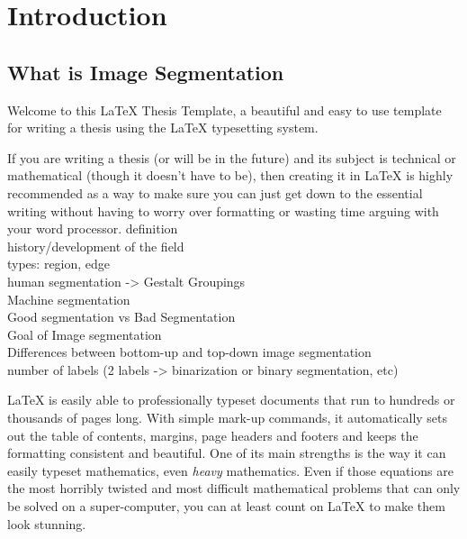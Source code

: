 
\chapter{Introduction} %

\label{Chapter1} %
\label{chap:Chapter1} %


\newcommand{\keyword}[1]{\textbf{#1}}
\newcommand{\tabhead}[1]{\textbf{#1}}
\newcommand{\code}[1]{\texttt{#1}}
\newcommand{\file}[1]{\texttt{\bfseries#1}}
\newcommand{\option}[1]{\texttt{\itshape#1}}


\section{What is Image Segmentation}
Welcome to this \LaTeX{} Thesis Template, a beautiful and easy to use template for writing a thesis using the \LaTeX{} typesetting system.

If you are writing a thesis (or will be in the future) and its subject is technical or mathematical (though it doesn't have to be), then creating it in \LaTeX{} is highly recommended as a way to make sure you can just get down to the essential writing without having to worry over formatting or wasting time arguing with your word processor.
definition\\
history/development of the field\\
types: region, edge\\
human segmentation -> Gestalt Groupings\\
Machine segmentation\\
Good segmentation vs Bad Segmentation\\
Goal of Image segmentation\\
Differences between bottom-up and top-down image segmentation\\
number of labels (2 labels -> binarization or binary segmentation, etc)

\LaTeX{} is easily able to professionally typeset documents that run to hundreds or thousands of pages long. With simple mark-up commands, it automatically sets out the table of contents, margins, page headers and footers and keeps the formatting consistent and beautiful. One of its main strengths is the way it can easily typeset mathematics, even \emph{heavy} mathematics. Even if those equations are the most horribly twisted and most difficult mathematical problems that can only be solved on a super-computer, you can at least count on \LaTeX{} to make them look stunning.

